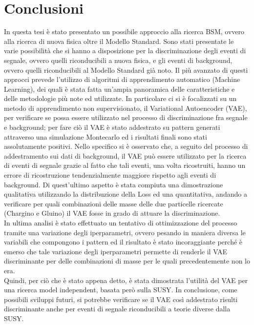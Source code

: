 
\section{Conclusioni}
\label{sec:conclusioni}

In questa tesi è stato presentato un possibile approccio alla ricerca BSM, ovvero alla ricerca di nuova fisica oltre il Modello Standard. Sono stati presentate le varie possibilità che si hanno a disposizione per la discriminazione degli eventi di segnale, ovvero quelli riconducibili a nuova fisica, e gli eventi di background, ovvero quelli riconducibili al Modello Standard già noto. Il più avanzato di questi approcci prevede l'utilizzo di algoritmi di apprendimento automatico (Machine Learning), dei quali è stata fatta un'ampia panoramica delle caratteristiche e delle metodologie più note ed utilizzate. In particolare ci si è focalizzati su un metodo di apprendimento non supervisionato, il Variational Autoencoder (VAE), per verificare se possa essere utilizzato nel processo di discriminazione fra segnale e background; per fare ciò il VAE è stato addestrato su pattern generati attraverso una simulazione Montecarlo ed i risultati finali sono stati assolutamente positivi. Nello specifico si è osservato che, a seguito del processo di addestramento sui dati di background, il VAE può essere utilizzato per la ricerca di eventi di segnale grazie al fatto che tali eventi, una volta ricostruiti, hanno un errore di ricostruzione tendenzialmente maggiore rispetto agli eventi di background. Di quest'ultimo aspetto è stata compiuta una dimostrazione qualitativa utilizzando la distribuzione della Loss ed una quantitativa, andando a verificare per quali combinazioni delle masse delle due particelle ricercate (Chargino e Gluino) il VAE fosse in grado di attuare la discriminazione.\\
In ultima analisi è stato effettuato un tentativo di ottimizzazione del processo tramite una variazione degli iperparametri, ovvero pesando in maniera diversa le variabili che compongono i pattern ed il risultato è stato incoraggiante perché è emerso che tale variazione degli iperparametri permette di renderle il VAE discriminante per delle combinazioni di masse per le quali precedentemente non lo era.\\
Quindi, per ciò che è stato appena detto, è stata dimostrata l'utilità del VAE per una ricerca model independent, basata però sulla SUSY. In conclusione, come possibili sviluppi futuri, si potrebbe verificare se il VAE così addestrato risulti discriminante anche per eventi di segnale riconducibili a teorie diverse dalla SUSY.